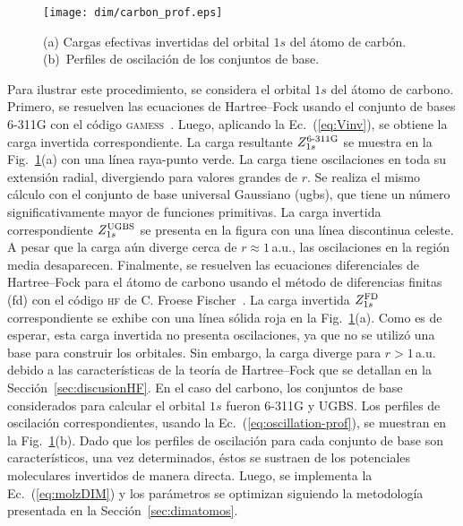 \begin{figure}[t]
\centering
\texttt{[image: dim/carbon\_prof.eps]}
\caption[Inversión de orbitales descriptos con conjuntos de base 
finitos.]
{(a) Cargas efectivas invertidas del orbital $1s$ del átomo de carbón.
(b)~Perfiles de oscilación de los conjuntos de base.}
\label{fig:1sCarbon}
\end{figure}

Para ilustrar este procedimiento, se considera el orbital $1s$ del átomo 
de carbono. Primero, se resuelven las ecuaciones de Hartree--Fock usando 
el conjunto de bases \mbox{6-311G} con el código 
\textsc{gamess}~\cite{Schmidt:93,Gordon:05}. Luego, aplicando la 
Ec.~(\ref{eq:Vinv}), se obtiene la carga invertida correspondiente. La 
carga resultante $Z_{1s}^{\mbox{\scriptsize 6-311G}}$ se muestra en la 
Fig.~\ref{fig:1sCarbon}(a) con una línea raya-punto verde. La carga 
tiene oscilaciones en toda su extensión radial, divergiendo para valores 
grandes de $r$. Se realiza el mismo cálculo con el conjunto de base 
universal Gaussiano (\acs{ugbs}), que tiene un número significativamente 
mayor de funciones primitivas. La carga invertida correspondiente 
$Z_{1s}^{\mbox{\scriptsize UGBS}}$ se presenta en la figura con una 
línea discontinua celeste. A pesar que la carga aún diverge cerca de 
$r\approx1\,$a.u., las oscilaciones en la región media desaparecen. 
Finalmente, se resuelven las ecuaciones diferenciales de Hartree--Fock 
para el átomo de carbono usando el método de diferencias finitas 
(\acs{fd}) con el código \textsc{hf} de C. Froese 
Fischer~\cite{FroeseFischer:97}. La carga invertida 
$Z_{1s}^{\mbox{\scriptsize FD}}$ correspondiente se exhibe con una línea 
sólida roja en la Fig.~\ref{fig:1sCarbon}(a). Como es de esperar, esta 
carga invertida no presenta oscilaciones, ya que no se utilizó una base 
para construir los orbitales. Sin embargo, la carga diverge para 
$r>1\,$a.u. debido a las características de la teoría de Hartree--Fock 
que se detallan en la Sección~\ref{sec:discusionHF}. En el caso del 
carbono, los conjuntos de base considerados para calcular el orbital 
$1s$ fueron \mbox{6-311G} y UGBS. Los perfiles de oscilación 
correspondientes, usando la Ec.~(\ref{eq:oscillation-prof}), se muestran 
en la Fig.~\ref{fig:1sCarbon}(b). Dado que los perfiles de oscilación 
para cada conjunto de base son característicos, una vez determinados, 
éstos se sustraen de los potenciales moleculares invertidos de manera 
directa. Luego, se implementa la Ec.~(\ref{eq:molzDIM}) y los parámetros 
se optimizan siguiendo la metodología presentada en la 
Sección~\ref{sec:dimatomos}.


